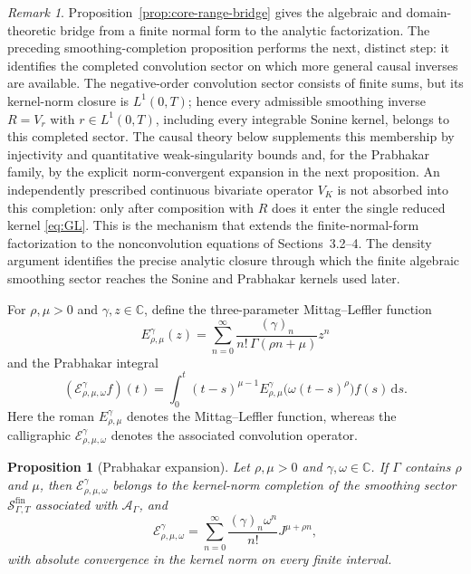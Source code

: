 \documentclass[11pt]{article}
\numberwithin{equation}{section}
\newtheorem{proposition}{Proposition}
\theoremstyle{definition}
\theoremstyle{remark}
\newtheorem{remark}{Remark}
\newcommand{\C}{\mathbb C}
\newcommand{\A}{\mathcal A}
\newcommand{\E}{\mathcal E}
\newcommand{\dd}{\,\mathrm d}
\begin{document}
\begin{remark}
Proposition~\ref{prop:core-range-bridge} gives the algebraic and domain-theoretic bridge from a finite normal form to the analytic factorization.  The preceding smoothing-completion proposition performs the next, distinct step: it identifies the completed convolution sector on which more general causal inverses are available.  The negative-order convolution sector consists of finite sums, but its kernel-norm closure is $L^1(0,T)$; hence every admissible smoothing inverse $R=V_r$ with $r\in L^1(0,T)$, including every integrable Sonine kernel, belongs to this completed sector. The causal theory below supplements this membership by injectivity and quantitative weak-singularity bounds and, for the Prabhakar family, by the explicit norm-convergent expansion in the next proposition. An independently prescribed continuous bivariate operator $V_K$ is not absorbed into this completion: only after composition with $R$ does it enter the single reduced kernel \eqref{eq:GL}. This is the mechanism that extends the finite-normal-form factorization to the nonconvolution equations of Sections~3.2--4.
The density argument identifies the precise analytic closure through which the finite algebraic smoothing sector reaches the Sonine and Prabhakar kernels used later.
\end{remark}

For $\rho,\mu>0$ and $\gamma,z\in\C$, define the three-parameter Mittag--Leffler function
\begin{equation*}
E_{\rho,\mu}^{\gamma}(z)
=\sum_{n=0}^{\infty}\frac{(\gamma)_n}{n!\,\Gamma(\rho n+\mu)}z^n
\end{equation*}
and the Prabhakar integral
\begin{equation}
(\E_{\rho,\mu,\omega}^{\gamma}f)(t)
=\int_0^t(t-s)^{\mu-1}E_{\rho,\mu}^{\gamma}\bigl(\omega(t-s)^\rho\bigr)f(s)\dd s.
\end{equation}
Here the roman $E_{\rho,\mu}^{\gamma}$ denotes the Mittag--Leffler function, whereas the calligraphic $\E_{\rho,\mu,\omega}^{\gamma}$ denotes the associated convolution operator.

\begin{proposition}[Prabhakar expansion]\label{prop:prabhakar-expansion}
Let $\rho,\mu>0$ and $\gamma,\omega\in\C$. If $\Gamma$ contains $\rho$ and $\mu$, then $\E_{\rho,\mu,\omega}^{\gamma}$ belongs to the kernel-norm completion of the smoothing sector $\mathcal S_{\Gamma,T}^{\mathrm{fin}}$ associated with $\A_\Gamma$, and
\begin{equation}
\E_{\rho,\mu,\omega}^{\gamma}
=\sum_{n=0}^{\infty}\frac{(\gamma)_n\omega^n}{n!}J^{\mu+\rho n},
\label{eq:prabhakar-expansion}
\end{equation}
with absolute convergence in the kernel norm on every finite interval.
\end{proposition}
\end{document}
